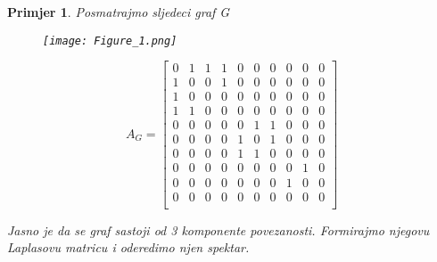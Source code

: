 \documentclass[11pt]{article}
\newtheorem{example}{Primjer}
\begin{document}
		\begin{example}
		Posmatrajmo sljedeci graf G
		\begin{figure}[h]
			\centering
			\texttt{[image: Figure\_1.png]}
		\end{figure}
		\[
			A_G =
			\begin{bmatrix}
				0  &  1  &  1  &  1  &  0  & 0  &  0  &  0  &  0  &  0\\
				1  &  0  &  0  &  1  &  0  & 0  &  0  &  0  &  0  &  0\\
				1  &  0  &  0  &  0  &  0  & 0  &  0  &  0  &  0  &  0\\
				1  &  1  &  0  &  0  &  0  & 0  &  0  &  0  &  0  &  0\\
				0  &  0  &  0  &  0  &  0  & 1  &  1  &  0  &  0  &  0\\
				0  &  0  &  0  &  0  &  1  & 0  &  1  &  0  &  0  &  0\\
				0  &  0  &  0  &  0  &  1  & 1  &  0  &  0  &  0  &  0\\
				0  &  0  &  0  &  0  &  0  & 0  &  0  &  0  &  1  &  0\\
				0  &  0  &  0  &  0  &  0  & 0  &  0  &  1  &  0  &  0\\
				0  &  0  &  0  &  0  &  0  & 0  &  0  &  0  &  0  &  0\\
			\end{bmatrix}
			\]
			
			Jasno je da se graf sastoji od 3 komponente povezanosti. Formirajmo njegovu Laplasovu matricu i oderedimo njen spektar.
			

\end{example}
\end{document}
